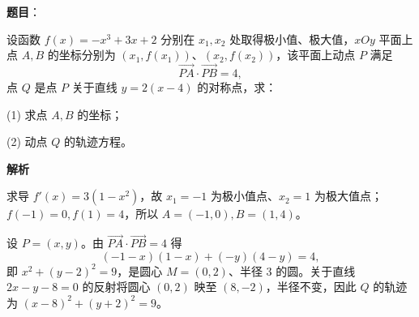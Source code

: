 \begin{answer}

\textbf{题目}：

设函数 \(f(x)=-x^3+3x+2\) 分别在 \(x_1,x_2\) 处取得极小值、极大值，\(xOy\) 平面上点 \(A,B\) 的坐标分别为 \((x_1,f(x_1))\)、\((x_2,f(x_2))\)，该平面上动点 \(P\) 满足
\nopagebreak[4]
\[
\overrightarrow{PA}\cdot\overrightarrow{PB}=4,
\]
点 \(Q\) 是点 \(P\) 关于直线 \(y=2(x-4)\) 的对称点，求：

(1) 求点 \(A,B\) 的坐标；

(2) 动点 \(Q\) 的轨迹方程。

\textbf{解析}


求导 $f'(x)=3(1-x^2)$，故 $x_1=-1$ 为极小值点、$x_2=1$ 为极大值点；$f(-1)=0,f(1)=4$，所以 $A=(-1,0),B=(1,4)$。


设 $P=(x,y)$。由 $\overrightarrow{PA}\cdot\overrightarrow{PB}=4$ 得
\nopagebreak[4]
\[
(-1-x)(1-x)+(-y)(4-y)=4,
\]
即 $x^2+(y-2)^2=9$，是圆心 $M=(0,2)$、半径 $3$ 的圆。关于直线 $2x-y-8=0$ 的反射将圆心 $(0,2)$ 映至 $(8,-2)$，半径不变，因此 $Q$ 的轨迹为 $(x-8)^2+(y+2)^2=9$。



\end{answer}
